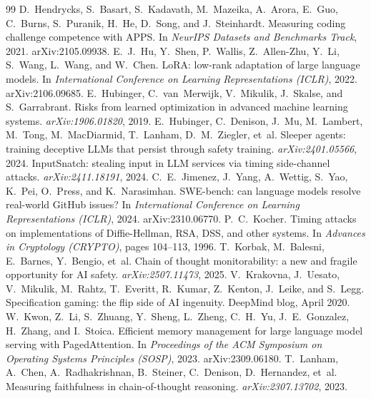 \documentclass[10pt,twocolumn]{article}
\begin{document}
\begin{thebibliography}{99}
 D.~Hendrycks, S.~Basart, S.~Kadavath, M.~Mazeika, A.~Arora, E.~Guo, C.~Burns, S.~Puranik, H.~He, D.~Song, and J.~Steinhardt. Measuring coding challenge competence with APPS. In \emph{NeurIPS Datasets and Benchmarks Track}, 2021. arXiv:2105.09938.
 E.~J.~Hu, Y.~Shen, P.~Wallis, Z.~Allen-Zhu, Y.~Li, S.~Wang, L.~Wang, and W.~Chen. LoRA: low-rank adaptation of large language models. In \emph{International Conference on Learning Representations (ICLR)}, 2022. arXiv:2106.09685.
 E.~Hubinger, C.~van~Merwijk, V.~Mikulik, J.~Skalse, and S.~Garrabrant. Risks from learned optimization in advanced machine learning systems. \emph{arXiv:1906.01820}, 2019.
 E.~Hubinger, C.~Denison, J.~Mu, M.~Lambert, M.~Tong, M.~MacDiarmid, T.~Lanham, D.~M.~Ziegler, et~al. Sleeper agents: training deceptive LLMs that persist through safety training. \emph{arXiv:2401.05566}, 2024.
 InputSnatch: stealing input in LLM services via timing side-channel attacks. \emph{arXiv:2411.18191}, 2024.
 C.~E.~Jimenez, J.~Yang, A.~Wettig, S.~Yao, K.~Pei, O.~Press, and K.~Narasimhan. SWE-bench: can language models resolve real-world GitHub issues? In \emph{International Conference on Learning Representations (ICLR)}, 2024. arXiv:2310.06770.
 P.~C.~Kocher. Timing attacks on implementations of Diffie-Hellman, RSA, DSS, and other systems. In \emph{Advances in Cryptology (CRYPTO)}, pages 104--113, 1996.
 T.~Korbak, M.~Balesni, E.~Barnes, Y.~Bengio, et~al. Chain of thought monitorability: a new and fragile opportunity for AI safety. \emph{arXiv:2507.11473}, 2025.
 V.~Krakovna, J.~Uesato, V.~Mikulik, M.~Rahtz, T.~Everitt, R.~Kumar, Z.~Kenton, J.~Leike, and S.~Legg. Specification gaming: the flip side of AI ingenuity. DeepMind blog, April 2020.
 W.~Kwon, Z.~Li, S.~Zhuang, Y.~Sheng, L.~Zheng, C.~H.~Yu, J.~E.~Gonzalez, H.~Zhang, and I.~Stoica. Efficient memory management for large language model serving with PagedAttention. In \emph{Proceedings of the ACM Symposium on Operating Systems Principles (SOSP)}, 2023. arXiv:2309.06180.
 T.~Lanham, A.~Chen, A.~Radhakrishnan, B.~Steiner, C.~Denison, D.~Hernandez, et~al. Measuring faithfulness in chain-of-thought reasoning. \emph{arXiv:2307.13702}, 2023.

\end{thebibliography}
\end{document}
